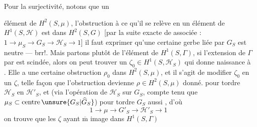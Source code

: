 Pour la surjectivité, notons que  un

élément de $H^2(S,\mu)$, l'obstruction à ce qu'il
se relève en un élément \inserted{$\zeta$} de $H^1(S,\mathcal H)$ est
dans $H^2(S,G)$ [par la suite exacte
de  associée : $1\longrightarrow\mu_S\longrightarrow G_S\longrightarrow\mathcal H_S\longrightarrow1$]
il faut exprimer qu'une certaine  gerbe
liée par $G_S$ est neutre --- brr!. Mais
partons plutôt de l'élément \unsure{$\omega$|$\widetilde\zeta$} de $H^1(S,\Gamma)$,
si l'extension de $\Gamma$ par  est scindée, alors
on peut trouver un $\zeta_0\in H^1(S,\mathcal H_S)$ qui
donne naissance à \unsure{$\omega$}. Elle a une certaine
obstruction $\rho_0$ dans $H^2(S,\mu)$, et il s'agit
de modifier $\zeta_0$ en un $\zeta$,  telle façon que
l'obstruction devienne $\rho\in H^2(S,\mu)$ donné.
  pour tordre $\mathcal H_S$ en
$\mathcal H'_S$, et (via l'opération de $\mathcal H_S$  sur $G_S$,
compte tenu que $\mu_S\subset\mathrm{centre}\,\unsure{G_S|\widehat G_S}$) pour
tordre $G_S$ aussi , d'où
\[
1\longrightarrow\mu\longrightarrow G'_S\longrightarrow\mathcal H'_S\longrightarrow1
\]
on trouve que les $\zeta$ ayant $\overline{\mathrm m}$ image dans $H^1(S,\Gamma)$
